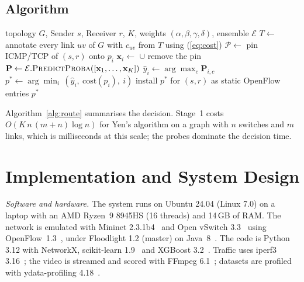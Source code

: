 \documentclass[conference,a4paper]{IEEEtran}
\begin{document}
\subsection{Algorithm}
\begin{algorithm}[t]
\caption{Two-stage multimedia route selection}
\label{alg:route}
\begin{algorithmic}[1]
\Require topology $G$, Sender $s$, Receiver $r$, $K$, weights $(\alpha,\beta,\gamma,\delta)$, ensemble $\mathcal{E}$
\State $T \gets$  
\State annotate every link $uv$ of $G$ with $c_{uv}$ from $T$ using (\ref{eq:cost})
\State $\mathcal{P} \gets$ 
  \State pin ICMP/TCP of $(s,r)$ onto $p_i$
  \State $\mathbf{x}_i \gets$  $\cup$  
  \State remove the pin
\EndFor
\State $\mathbf{P} \gets \mathcal{E}.\Call{PredictProba}{[\mathbf{x}_1,\ldots,\mathbf{x}_K]}$ 
\State $\hat{y}_i \gets \arg\max_c \mathbf{P}_{i,c}$
\State $p^\ast \gets \arg\min_i\,(\hat{y}_i,\ \mathrm{cost}(p_i),\ i)$
\State install $p^\ast$ for $(s,r)$ as static OpenFlow entries
\State \Return $p^\ast$
\end{algorithmic}
\end{algorithm}

Algorithm~\ref{alg:route} summarises the decision. Stage~1 costs $O(K\,n\,(m+n)\log n)$ for Yen's algorithm on a
graph with $n$ switches and $m$ links, which is milliseconds at this scale; the probes dominate the decision time.

\section{Implementation and System Design}
\textit{Software and hardware.} The system runs on Ubuntu 24.04 (Linux 7.0) on a laptop with an AMD Ryzen~9 8945HS
(16 threads) and 14\,GB of RAM. The network is emulated with Mininet 2.3.1b4~\cite{lantz2010mininet} and Open
vSwitch 3.3~\cite{pfaff2015ovs} using OpenFlow~1.3~\cite{mckeown2008openflow}, under Floodlight 1.2 (master) on
Java~8~\cite{floodlight}. The code is Python 3.12 with NetworkX, scikit-learn 1.9~\cite{pedregosa2011sklearn} and
XGBoost 3.2~\cite{chen2016xgboost}. Traffic uses iperf3 3.16~\cite{iperf3}; the video is streamed and scored with
FFmpeg 6.1~\cite{ffmpeg}; datasets are profiled with ydata-profiling 4.18~\cite{ydataprofiling}.
\end{document}
